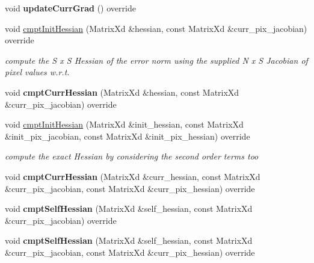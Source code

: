 \begin{DoxyCompactItemize}
\item 
\hypertarget{classLKLD_a808c49a65bb6cb4fe4bdde5b3a312bba}{void {\bfseries update\-Curr\-Grad} () override}\label{classLKLD_a808c49a65bb6cb4fe4bdde5b3a312bba}

\item 
void \hyperlink{classLKLD_afade6d2ff2dad18c48460efe02f5984d}{cmpt\-Init\-Hessian} (Matrix\-Xd \&hessian, const Matrix\-Xd \&curr\-\_\-pix\-\_\-jacobian) override
\begin{DoxyCompactList}\small\item\em compute the S x S Hessian of the error norm using the supplied N x S Jacobian of pixel values w.\-r.\-t. \end{DoxyCompactList}\item 
\hypertarget{classLKLD_ac21f795cf2237c4efa7c696df201c42b}{void {\bfseries cmpt\-Curr\-Hessian} (Matrix\-Xd \&hessian, const Matrix\-Xd \&curr\-\_\-pix\-\_\-jacobian) override}\label{classLKLD_ac21f795cf2237c4efa7c696df201c42b}

\item 
\hypertarget{classLKLD_abf514ea8c410ea513ec10393b9f460c9}{void \hyperlink{classLKLD_abf514ea8c410ea513ec10393b9f460c9}{cmpt\-Init\-Hessian} (Matrix\-Xd \&init\-\_\-hessian, const Matrix\-Xd \&init\-\_\-pix\-\_\-jacobian, const Matrix\-Xd \&init\-\_\-pix\-\_\-hessian) override}\label{classLKLD_abf514ea8c410ea513ec10393b9f460c9}

\begin{DoxyCompactList}\small\item\em compute the exact Hessian by considering the second order terms too \end{DoxyCompactList}\item 
\hypertarget{classLKLD_a0bcb5e858e930e273ef09b0d33d67187}{void {\bfseries cmpt\-Curr\-Hessian} (Matrix\-Xd \&curr\-\_\-hessian, const Matrix\-Xd \&curr\-\_\-pix\-\_\-jacobian, const Matrix\-Xd \&curr\-\_\-pix\-\_\-hessian) override}\label{classLKLD_a0bcb5e858e930e273ef09b0d33d67187}

\item 
\hypertarget{classLKLD_ab83c2820be65c2dad2a1da4da99958f3}{void {\bfseries cmpt\-Self\-Hessian} (Matrix\-Xd \&self\-\_\-hessian, const Matrix\-Xd \&curr\-\_\-pix\-\_\-jacobian) override}\label{classLKLD_ab83c2820be65c2dad2a1da4da99958f3}

\item 
\hypertarget{classLKLD_a95651c737f9870cab4e610f4659cc0d6}{void {\bfseries cmpt\-Self\-Hessian} (Matrix\-Xd \&self\-\_\-hessian, const Matrix\-Xd \&curr\-\_\-pix\-\_\-jacobian, const Matrix\-Xd \&curr\-\_\-pix\-\_\-hessian) override}\label{classLKLD_a95651c737f9870cab4e610f4659cc0d6}


\end{DoxyCompactItemize}
